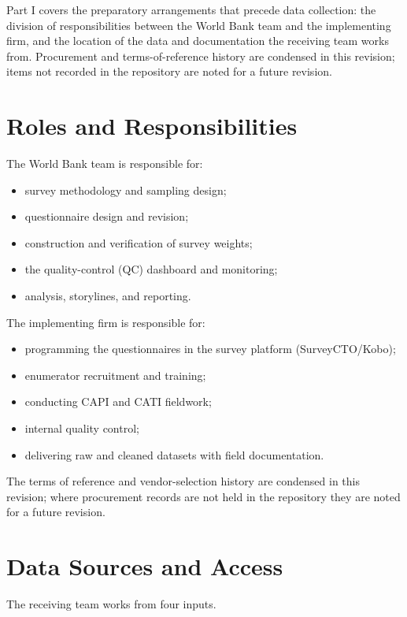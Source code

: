 
Part I covers the preparatory arrangements that precede data collection: the division of responsibilities between the World Bank team and the implementing firm, and the location of the data and documentation the receiving team works from. Procurement and terms-of-reference history are condensed in this revision; items not recorded in the repository are noted for a future revision.

\section{Roles and Responsibilities}

The World Bank team is responsible for:
\begin{itemize}[leftmargin=1.5em]
  \item survey methodology and sampling design;
  \item questionnaire design and revision;
  \item construction and verification of survey weights;
  \item the quality-control (QC) dashboard and monitoring;
  \item analysis, storylines, and reporting.
\end{itemize}

The implementing firm is responsible for:
\begin{itemize}[leftmargin=1.5em]
  \item programming the questionnaires in the survey platform (SurveyCTO/Kobo);
  \item enumerator recruitment and training;
  \item conducting CAPI and CATI fieldwork;
  \item internal quality control;
  \item delivering raw and cleaned datasets with field documentation.
\end{itemize}

The terms of reference and vendor-selection history are condensed in this revision; where procurement records are not held in the repository they are noted for a future revision.

\section{Data Sources and Access}

The receiving team works from four inputs.

